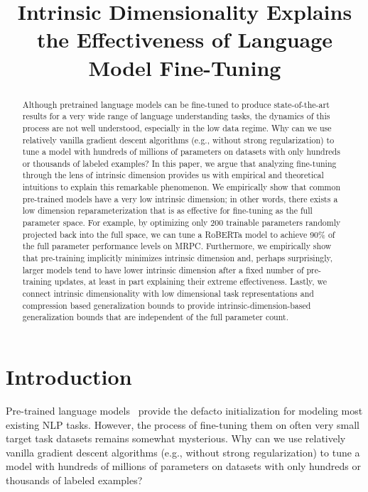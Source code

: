 \title{Intrinsic Dimensionality Explains the Effectiveness of Language Model Fine-Tuning}

\begin{abstract}
Although pretrained language models can be fine-tuned to produce state-of-the-art results for a very wide range of language understanding tasks, the dynamics of this process are not well understood, especially in the low data regime. Why can we use relatively vanilla gradient descent algorithms (e.g., without strong regularization) to tune a model with hundreds of millions of parameters on datasets with only hundreds or thousands of labeled examples? In this paper, we argue that analyzing fine-tuning through the lens of intrinsic dimension provides us with empirical and theoretical intuitions to explain this remarkable phenomenon. We empirically show that common pre-trained models have a very low intrinsic dimension; in other words, there exists a low dimension reparameterization that is as effective for fine-tuning as the full parameter space. For example, by optimizing only 200 trainable parameters randomly projected back into the full space, we can tune a RoBERTa model to achieve 90\% of the full parameter performance levels on MRPC. Furthermore, we empirically show that pre-training implicitly minimizes intrinsic dimension and, perhaps surprisingly, larger models tend to have lower intrinsic dimension after a fixed number of pre-training updates, at least in part explaining their extreme effectiveness. Lastly, we connect intrinsic dimensionality with low dimensional task representations and compression based generalization bounds to provide intrinsic-dimension-based generalization bounds that are independent of the full parameter count.
\end{abstract}

\section{Introduction}
Pre-trained language models~\citep{GPT, BERT, ROBERTA, BART,MARGE}  provide the defacto initialization for modeling most existing NLP tasks. However, the process of fine-tuning them on often very small target task datasets remains somewhat mysterious. Why can we use relatively vanilla gradient descent algorithms (e.g., without strong regularization) to tune a model with hundreds of millions of parameters on datasets with only hundreds or thousands of labeled examples?  

